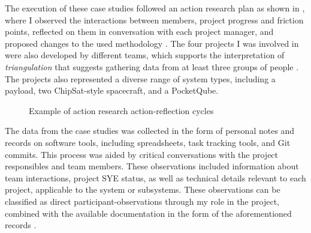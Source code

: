 \documentclass[a4paper,nobib,justified,final]{tufte-book}
\begin{document}
The execution of these case studies followed an action research plan as shown in , where I observed the interactions between members, project progress and friction points, reflected on them in conversation with each project manager, and proposed changes to the used methodology \autocite{mcniffActionResearchPrinciples2003}. The four projects I was involved in were also developed by different teams, which supports the interpretation of \emph{triangulation} that suggests gathering data from at least three groups of people \autocite{mcniffYouYourAction2010}. The projects also represented a diverse range of system types, including a payload, two ChipSat-style spacecraft, and a PocketQube.

\begin{figure}
	\caption[Example of action research action-reflection cycles]{Example of action research action-reflection cycles \cite{mcniffActionResearchPrinciples2003}}
	\label{fig:c_action_research}
\end{figure}

The data from the case studies was collected in the form of personal notes and records on software tools, including spreadsheets, task tracking tools, and Git commits. This process was aided by critical conversations with the project responsibles and team members. These observations included information about team interactions, project \ac{SYE} status, as well as technical details relevant to each project, applicable to the system or subsystems. These observations can be classified as direct participant-observations through my role in the project, combined with the available documentation in the form of the aforementioned records \autocite{yinCaseStudyResearch2014}.
\end{document}
